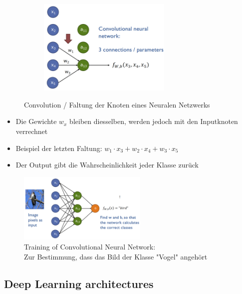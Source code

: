 \documentclass[a4paper]{article}
\begin{document}
\begin{figure}[htb!]
\begin{subfigure}[b]{0.475\textwidth}
			\end{subfigure}
			\quad
			\begin{subfigure}[b]{0.475\textwidth}
				\centering
				\includegraphics[width=0.7\textwidth]{img/07_convolutional_nn/cnn_04.png}
			\end{subfigure}
		\caption{Convolution / Faltung der Knoten eines Neuralen Netzwerks}
		\end{figure}
	
		\begin{itemize}
			\item Die Gewichte $w_{x}$ bleiben diesselben, werden jedoch mit den Inputknoten verrechnet
			\item Beispiel der letzten Faltung: $w_1 \cdot x_3 + w_2 \cdot x_4 + w_3 \cdot x_5$
			\item Der Output gibt die Wahrscheinlichkeit jeder Klasse zurück
		\end{itemize}
	
		\begin{figure}[htb!]
			\centering
			\includegraphics[width=0.55\textwidth]{img/07_convolutional_nn/cnn_birb.png}
			\caption{Training of Convolutional Neural Network: \\
				Zur Bestimmung, dass das Bild der Klasse "Vogel" angehört}
		\end{figure}
	
		\subsection{Deep Learning architectures}
		
\end{document}
